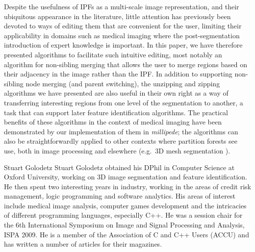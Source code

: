 \documentclass[10pt,twocolumn,twoside]{IEEEtran}
\begin{document}
Despite the usefulness of IPFs as a multi-scale image representation, and their ubiquitous appearance in the literature, little attention has previously been devoted to ways of editing them that are convenient for the user, limiting their applicability in domains such as medical imaging where the post-segmentation introduction of expert knowledge is important. In this paper, we have therefore presented algorithms to facilitate such intuitive editing, most notably an algorithm for non-sibling merging that allows the user to merge regions based on their adjacency in the image rather than the IPF. In addition to supporting non-sibling node merging (and parent switching), the unzipping and zipping algorithms we have presented are also useful in their own right as a way of transferring interesting regions from one level of the segmentation to another, a task that can support later feature identification algorithms. The practical benefits of these algorithms in the context of medical imaging have been demonstrated by our implementation of them in \emph{millipede}; the algorithms can also be straightforwardly applied to other contexts where partition forests see use, both in image processing and elsewhere (e.g.~3D mesh segmentation \cite{garland01}).

\clearpage




\begin{IEEEbiography}{Stuart Golodetz}
Stuart Golodetz obtained his DPhil in Computer Science at Oxford University, working on 3D image segmentation and feature identification. He then spent two interesting years in industry, working in the areas of credit risk management, logic programming and software analytics. His areas of interest include medical image analysis, computer games development and the intricacies of different programming languages, especially C++. He was a session chair for the 6th International Symposium on Image and Signal Processing and Analysis, ISPA 2009. He is a member of the Association of C and C++ Users (ACCU) and has written a number of articles for their magazines.
\end{IEEEbiography}
\end{document}
